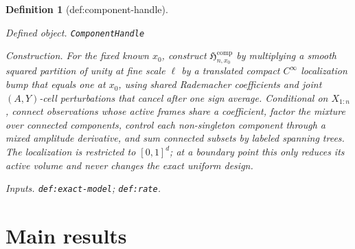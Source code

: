 \documentclass{article}
\newtheorem{definition}{Definition}
\begin{document}
\begin{definition}[def:component-handle]\label{def:component-handle}
\par\smallskip\noindent\emph{Defined object.} \texttt{ComponentHandle}
\par\smallskip\noindent\emph{Construction.} For the fixed known \(x_0\), construct \(\mathfrak H_{n,x_0}^{\mathrm{comp}}\) by multiplying a smooth squared partition of unity at fine scale \(\ell\) by a translated compact \(C^\infty\) localization bump that equals one at \(x_0\), using shared Rademacher coefficients and joint \((A,Y)\)-cell perturbations that cancel after one sign average.  Conditional on \(X_{1:n}\), connect observations whose active frames share a coefficient, factor the mixture over connected components, control each non-singleton component through a mixed amplitude derivative, and sum connected subsets by labeled spanning trees.  The localization is restricted to \([0,1]^d\); at a boundary point this only reduces its active volume and never changes the exact uniform design.
\par\smallskip\noindent\emph{Inputs.} \texttt{def:\allowbreak{}exact-\allowbreak{}model}; \texttt{def:\allowbreak{}rate}.
\end{definition}

\section{Main results}
\end{document}
